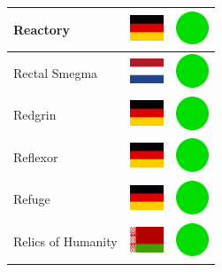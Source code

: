 \documentclass[12pt, a4paper, twoside]{report}
\begin{document}
\begin{center}
\begin{longtable}{|p{5cm}|p{2cm}|p{2cm}|}
 Reactory                                                   & \includegraphics[width=1cm]{../4x3/de} &   \includegraphics[width=1cm]{../likes/y} \\ \hline
 Rectal Smegma                                              & \includegraphics[width=1cm]{../4x3/nl} &   \includegraphics[width=1cm]{../likes/y} \\ \hline
 Redgrin                                                    & \includegraphics[width=1cm]{../4x3/de} &   \includegraphics[width=1cm]{../likes/y} \\ \hline
 Reflexor                                                   & \includegraphics[width=1cm]{../4x3/de} &   \includegraphics[width=1cm]{../likes/y} \\ \hline
 Refuge                                                     & \includegraphics[width=1cm]{../4x3/de} &   \includegraphics[width=1cm]{../likes/y} \\ \hline
 Relics of Humanity                                         & \includegraphics[width=1cm]{../4x3/by} &   \includegraphics[width=1cm]{../likes/y} \\ \hline

\end{longtable}
\end{center}
\end{document}

